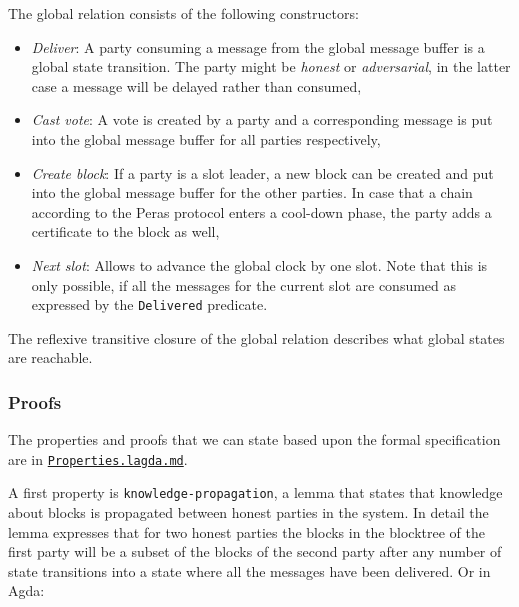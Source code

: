 \documentclass[10pt]{article}
\providecommand{\tightlist}{%
  \setlength{\itemsep}{0pt}\setlength{\parskip}{0pt}}
\begin{document}
The global relation consists of the following constructors:

\begin{itemize}
\tightlist
\item
  \emph{Deliver}: A party consuming a message from the global message
  buffer is a global state transition. The party might be \emph{honest}
  or \emph{adversarial}, in the latter case a message will be delayed
  rather than consumed,
\item
  \emph{Cast vote}: A vote is created by a party and a corresponding
  message is put into the global message buffer for all parties
  respectively,
\item
  \emph{Create block}: If a party is a slot leader, a new block can be
  created and put into the global message buffer for the other parties.
  In case that a chain according to the Peras protocol enters a
  cool-down phase, the party adds a certificate to the block as well,
\item
  \emph{Next slot}: Allows to advance the global clock by one slot. Note
  that this is only possible, if all the messages for the current slot
  are consumed as expressed by the \texttt{Delivered} predicate.
\end{itemize}

The reflexive transitive closure of the global relation describes what
global states are reachable.

\subsubsection{Proofs}\label{proofs}

The properties and proofs that we can state based upon the formal
specification are in
\href{../../src/Peras/SmallStep/Properties.lagda.md}{\color{blue}\texttt{Properties.lagda.md}}.

A first property is \texttt{knowledge-propagation}, a lemma that states
that knowledge about blocks is propagated between honest parties in the
system. In detail the lemma expresses that for two honest parties the
blocks in the blocktree of the first party will be a subset of the
blocks of the second party after any number of state transitions into a
state where all the messages have been delivered. Or in Agda:
\end{document}
